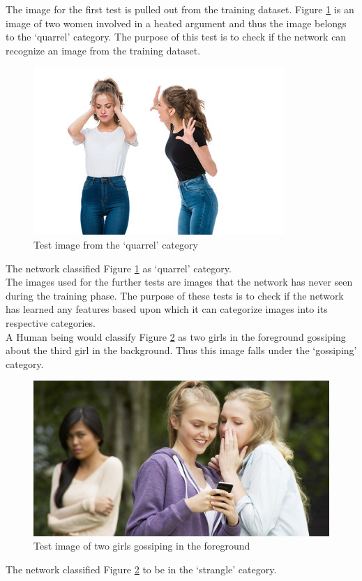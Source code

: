 \documentclass[12pt]{article}
\begin{document}
\noindent
The image for the first test is pulled out from the training dataset. Figure \ref{fig:quarrel} is an image of two women involved in a heated argument and thus the image belongs to the \lq{quarrel}\rq{} category. The purpose of this test is to check if the network can recognize an image from the training dataset. 
\begin{figure}[H]
\centering
  \includegraphics[width=.6\linewidth]{./Images/quarrel.jpg}
  \caption{Test image from the \lq{quarrel}\rq{} category}
  \label{fig:quarrel}
\end{figure}
The network classified Figure \ref{fig:quarrel} as \lq{quarrel}\rq{} category. \\

\noindent
The images used for the further tests are images that the network has never seen during the training phase. The purpose of these tests is to check if the network has learned any features based upon which it can categorize images into its respective categories. \\

A Human being would classify Figure \ref{fig:gossip1} as two girls in the foreground gossiping about the third girl in the background. Thus this image falls under the \lq{gossiping}\rq{} category. 
\begin{figure}[H]
\centering
  \includegraphics[width=.6\linewidth]{./Images/gossiping1.jpg}
  \caption{Test image of two girls gossiping in the foreground}
  \label{fig:gossip1}
\end{figure}
The network classified Figure \ref{fig:gossip1} to be in the  \lq{strangle}\rq{} category. \\
\end{document}
